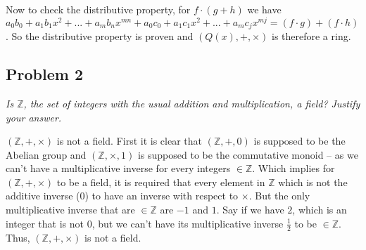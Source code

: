 \documentclass[11pt]{article}
\begin{document}
Now to check the distributive property, for $f \cdot (g + h)$ we have $a_0 b_0 + a_1 b_1 x^2 + ... + a_m b_n x^{mn} + a_0 c_0 + a_1 c_1 x^2 + ... + a_m c_j x^{mj} = (f \cdot g) + (f \cdot h)$. So the distributive property is proven and $(Q(x), +, \times)$ is therefore a ring.



\subsection*{Problem 2}
\textit{Is $\mathbb{Z}$, the set of integers with the usual addition and multiplication, a field? Justify your answer.}\newline

$(\mathbb{Z}, +, \times)$ is not a field. First it is clear that $(\mathbb{Z}, +, 0)$ is supposed to be the Abelian group and $(\mathbb{Z}, \times, 1)$ is supposed to be the commutative monoid -- as we can't have a multiplicative inverse for every integers $\in \mathbb{Z}$. Which implies for $(\mathbb{Z}, +, \times)$ to be a field, it is required that every element in $\mathbb{Z}$ which is not the additive inverse ($0$) to have an inverse with respect to $\times$. But the only multiplicative inverse that are $\in \mathbb{Z}$ are $-1$ and $ 1$. Say if we have $2$, which is an integer that is not $0$, but we can't have its multiplicative inverse $\frac{1}{2}$ to be $\in \mathbb{Z}$. Thus, $(\mathbb{Z}, +, \times)$ is not a field.
\end{document}
